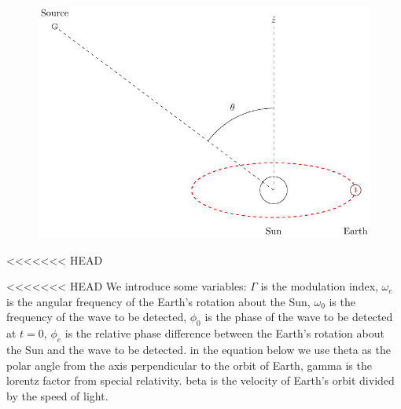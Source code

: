 \documentclass[onecolumn, groupedaddress, 10pt]{revtex4-1}
\begin{document}
\begin{figure}[ht]
	\centering
	\includegraphics[width=.75\linewidth]{earthMotionModulationFigure.pdf}
	\caption{\label{fig:earthMotionModulationFigure}}
\end{figure}

<<<<<<< HEAD

<<<<<<< HEAD
We introduce some variables: $\Gamma$ is the modulation index, $\omega_e$ is the angular frequency of the Earth's rotation about the Sun, $\omega_0$ is the frequency of the wave to be detected, $\phi_0$ is the phase of the wave to be detected at $t=0$, $\phi_e$ is the relative phase difference between the Earth's rotation about the Sun and the wave to be detected. in the equation below we use theta as the polar angle from the axis perpendicular to the orbit of Earth, gamma is the lorentz factor from special relativity. beta is the velocity of Earth's orbit divided by the speed of light. 
\end{document}
